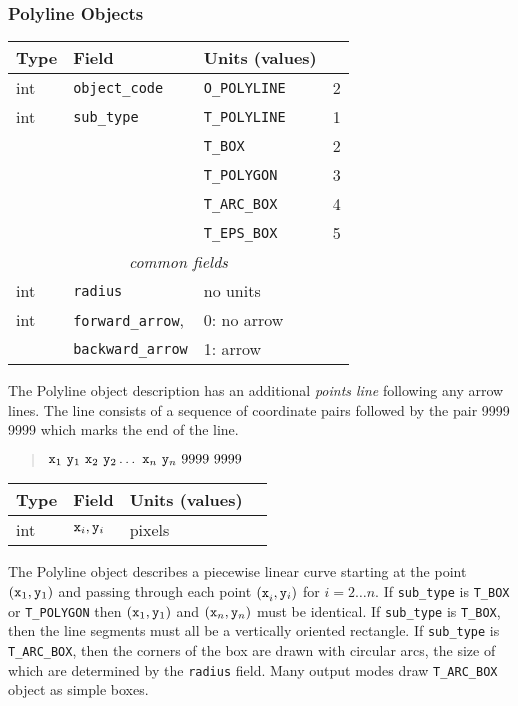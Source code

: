 \subsubsection{Polyline Objects}
%
\begin{center}
\begin{tabular} {|l|l|ll|}
\hline
Type	& Field			& Units (values)	&	\\ \hline
\hline
%
int	& {\tt object\_code} 	& {\tt O\_POLYLINE}	& 2	 \\ \hline
%
int	& {\tt sub\_type}	& {\tt T\_POLYLINE}	& 1	\\
	&			& {\tt T\_BOX}		& 2	\\
	&			& {\tt T\_POLYGON}	& 3	\\
	&                       & {\tt T\_ARC\_BOX}   	& 4	\\
	&                       & {\tt T\_EPS\_BOX}   	& 5	\\ \hline
%
\multicolumn{4}{c}{\it common fields}				\\ \hline
%
int	& {\tt radius}		& no units		& 	\\
int	& {\tt forward\_arrow},	& 0: no arrow		&	\\
	& {\tt backward\_arrow}	& 1: arrow		&	\\ \hline
\end{tabular}
\end{center}
%
The Polyline object description has an additional {\em points line} following
	any arrow lines.
The line consists of a sequence of coordinate pairs followed by the
	pair 9999 9999 which marks the end of the line.
%
\begin{quote}
$
	 {\tt x}_1 ~{\tt y}_1 ~{\tt x}_2 ~{\tt y}_2 \ldots
	~{\tt x}_n ~{\tt y}_n ~9999 ~9999
$
\end{quote}
%
\begin{center}
\begin{tabular} {|l|l|ll|}
\hline
Type	& Field			& Units (values)	&	\\ \hline
\hline
%
int	& ${\tt x}_i, {\tt y}_i$& pixels		&	\\ \hline
\end{tabular}
\end{center}

The Polyline object describes a piecewise linear curve starting at
	the point $({\tt x}_1, {\tt y}_1)$ and passing through 
	each point ${(\tt x}_i, {\tt y}_i)$ for $i = 2 \ldots n$.
If {\tt sub\_type} is {\tt T\_BOX} or {\tt T\_POLYGON} then 
	$({\tt x}_1, {\tt y}_1)$ and $({\tt x}_n, {\tt y}_n)$ must
	be identical.
If {\tt sub\_type} is {\tt T\_BOX}, then the line segments must all be
	a vertically oriented rectangle.
If {\tt sub\_type} is {\tt T\_ARC\_BOX}, then the corners of the box are
	drawn with circular arcs, the size of which are determined by
	the {\tt radius} field.
Many output modes draw {\tt T\_ARC\_BOX} object as simple boxes.

